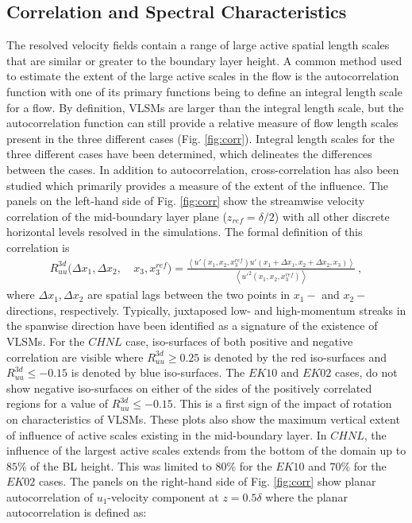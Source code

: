 \subsection{Correlation and Spectral Characteristics}
The resolved velocity fields contain a  range of large active spatial length scales that are similar or greater to the boundary layer height. A common method used to estimate the extent of the large active scales in the flow is the autocorrelation function with one of its primary functions being to define an integral length scale for a flow. By definition, VLSMs are larger than the integral length scale, but the autocorrelation function can still provide a relative measure of flow length scales present in the three different cases (Fig. \ref{fig:corr}). Integral length scales for the three different cases have been determined, which delineates the differences between the cases. In addition to autocorrelation, cross-correlation has also been studied which primarily provides a measure of the extent of the influence.  The panels on the left-hand side of Fig. \ref{fig:corr} show the streamwise velocity correlation of the mid-boundary layer plane ($z_{ref}=\delta/2$) with all other discrete horizontal levels resolved in the simulations. The formal definition of this correlation is 
\begin{align}
 R_{uu}^{3d}(\Delta x_1, \Delta x_2,\ & x_3, x_3^{ref})   =   \frac{\left < u'(x_1, x_2, x_3^{ref})u'(x_1 + \Delta x_1, x_2 + \Delta x_2, x_3) \right >}{\left < u'^{2}(x_1,x_2,x_3^{ref})\right >} \ ,
\label{eqn:3d_corr} 
\end{align}
where $\Delta x_1, \Delta x_2$ are spatial lags between the two points in $x_1-$ and $x_2-$directions, respectively. Typically,  juxtaposed low- and high-momentum streaks  in the spanwise direction have been identified as a signature of the existence of VLSMs. For the $CHNL$ case, iso-surfaces of both positive and negative correlation are visible where $R_{uu}^{3d}\geq 0.25$ is denoted by the red iso-surfaces and $R_{uu}^{3d}\leq -0.15$ is denoted by blue iso-surfaces. The $EK10$ and $EK02$ cases, do not show negative iso-surfaces on either of the sides of the positively correlated regions for a value of $R_{uu}^{3d}\leq -0.15$. This is a  first sign of the impact of rotation on characteristics of VLSMs. These plots also show the maximum vertical extent of influence of active scales existing in the mid-boundary layer. In $CHNL$, the influence of the largest active scales extends from the bottom of the domain up to   $85\%$ of the BL height. This was limited to $80\%$ for the $EK10$ and $70\%$ for the $EK02$ cases.  The panels on the right-hand side of Fig. \ref{fig:corr} show planar autocorrelation of $u_1$-velocity component at $ z=0.5\delta$ where the planar autocorrelation is defined as: 
